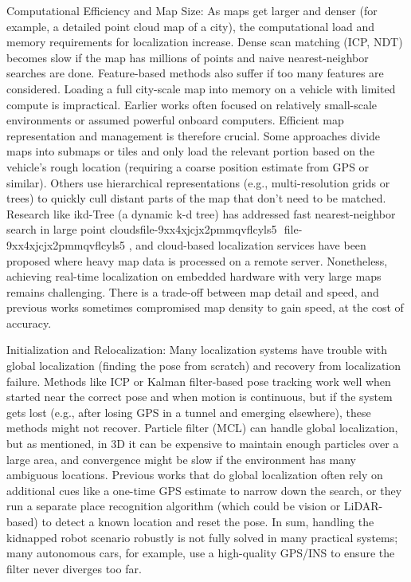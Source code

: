     Computational Efficiency and Map Size: As maps get larger and denser (for example, a detailed point cloud map of a city), the computational load and memory requirements for localization increase. Dense scan matching (ICP, NDT) becomes slow if the map has millions of points and naive nearest-neighbor searches are done. Feature-based methods also suffer if too many features are considered. Loading a full city-scale map into memory on a vehicle with limited compute is impractical. Earlier works often focused on relatively small-scale environments or assumed powerful onboard computers. Efficient map representation and management is therefore crucial. Some approaches divide maps into submaps or tiles and only load the relevant portion based on the vehicle’s rough location (requiring a coarse position estimate from GPS or similar). Others use hierarchical representations (e.g., multi-resolution grids or trees) to quickly cull distant parts of the map that don’t need to be matched. Research like ikd-Tree (a dynamic k-d tree) has addressed fast nearest-neighbor search in large point clouds​
    file-9xx4xjcjx2pmmqvflcyls5
    ​
    file-9xx4xjcjx2pmmqvflcyls5
    , and cloud-based localization services have been proposed where heavy map data is processed on a remote server. Nonetheless, achieving real-time localization on embedded hardware with very large maps remains challenging. There is a trade-off between map detail and speed, and previous works sometimes compromised map density to gain speed, at the cost of accuracy.

    Initialization and Relocalization: Many localization systems have trouble with global localization (finding the pose from scratch) and recovery from localization failure. Methods like ICP or Kalman filter-based pose tracking work well when started near the correct pose and when motion is continuous, but if the system gets lost (e.g., after losing GPS in a tunnel and emerging elsewhere), these methods might not recover. Particle filter (MCL) can handle global localization, but as mentioned, in 3D it can be expensive to maintain enough particles over a large area, and convergence might be slow if the environment has many ambiguous locations. Previous works that do global localization often rely on additional cues like a one-time GPS estimate to narrow down the search, or they run a separate place recognition algorithm (which could be vision or LiDAR-based) to detect a known location and reset the pose. In sum, handling the kidnapped robot scenario robustly is not fully solved in many practical systems; many autonomous cars, for example, use a high-quality GPS/INS to ensure the filter never diverges too far.

